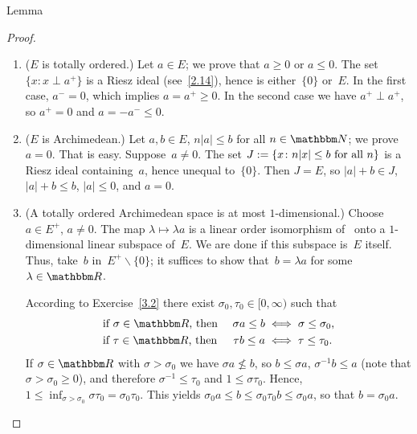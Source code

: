 \documentclass[main.tex]{subfiles}
\begin{document}
%
%
\begin{psec}{3.5}{Lemma}
\end{psec}
\begin{proof}
\begin{enumerate}[label=(\Roman*)]
\item \label{3.5-I} 
($E$ is totally ordered.) 
Let $a\in E$; 
we prove that $a\geq 0$ or $a\leq 0$.
The set $\{ x\colon x\perp a^+ \}$
is a Riesz ideal (see~\ref{2.14}),
hence is either~$\{0\}$ or~$E$.
In the first case,
$a^-=0$, 
which implies $a=a^+\geq 0$.
In the second case
we have $a^+ \perp a^+$, so $a^+=0$ 
and $a=-a^-\leq 0$.
%
\item \label{3.5-II}
($E$ is Archimedean.)
Let $a,b\in E$, $n|a|\leq b$ for all $n\in \N$;
we prove $a=0$. 
That is easy. 
Suppose~$a\neq 0$.
The set $J:=\{ x\colon n|x|\leq b\text{ for all }n\}$
is a Riesz ideal containing~$a$,
hence unequal to~$\{0\}$.
Then $J=E$,
so $|a|+b\in J$,
$|a|+b\leq b$,
$|a|\leq 0$,
and $a=0$.
%
\item \label{3.5-III} 
(A totally ordered Archimedean space is at most $1$-dimensional.)
Choose $a\in E^+$, $a\neq 0$.
The map $\lambda \mapsto \lambda a$ 
is a linear order isomorphism
of~\R{} onto a $1$-dimensional linear subspace of~$E$.
We are done if this subspace is~$E$ itself.
Thus, take~$b$ in~$E^+\backslash\{0\}$;
it suffices to show that~$b=\lambda a$
for some $\lambda \in \R$.

According to Exercise~\ref{3.2} there exist
$\sigma_0,\tau_0\in[0,\infty)$ such that
\begin{alignat*}{2}
&\htam{ if }\sigma\in\R\htam{, then }
  & \sigma a\leq b 
  &\iff \sigma\leq\sigma_0\htam{, } \\
&\htam{ if }\tau\in\R\htam{, then }
  & \tau b \leq a 
  &\iff \tau \leq \tau_0\htam{.}
\end{alignat*}
If $\sigma\in\R$ with $\sigma>\sigma_0$
we have $\sigma a\nleq b$,
so $b\leq \sigma a$,
$\sigma^{-1} b\leq a$
(note that $\sigma > \sigma_0 \geq 0$),
and therefore $\sigma^{-1}\leq \tau_0$
and $1\leq \sigma\tau_0$.
Hence, $1\leq \inf_{\sigma > \sigma_0}\sigma \tau_0 = \sigma_0 \tau_0$.
This yields $\sigma_0 a \leq b \leq \sigma_0 \tau_0 b \leq \sigma_0 a$,
so that $b = \sigma_0 a$. \xqed
\end{enumerate}
\end{proof}
%
%
\end{document}
